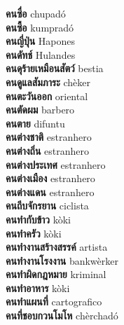 \textbf{ คนซื่อ  } chupadó \\
\textbf{ คนซื้อ  } kumpradó \\
\textbf{ คนญี่ปุ่น  } Hapones \\
\textbf{ คนดัทช์  } Hulandes \\
\textbf{ คนดุร้ายเหมือนสัตว์  } bestia \\
\textbf{ คนดูแลสัมภาระ  } chèker \\
\textbf{ คนตะวันออก  } oriental \\
\textbf{ คนตัดผม  } barbero \\
\textbf{ คนตาย  } difuntu \\
\textbf{ คนต่างชาติ  } estranhero \\
\textbf{ คนต่างถิ่น  } estranhero \\
\textbf{ คนต่างประเทศ  } estranhero \\
\textbf{ คนต่างเมือง  } estranhero \\
\textbf{ คนต่างแดน  } estranhero \\
\textbf{ คนถีบจักรยาน  } ciclista \\
\textbf{ คนทำกับข้าว  } kòki \\
\textbf{ คนทำครัว  } kòki \\
\textbf{ คนทำงานสร้างสรรค์  } artista \\
\textbf{ คนทำงานโรงงาน  } bankwèrker \\
\textbf{ คนทำผิดกฎหมาย  } kriminal \\
\textbf{ คนทำอาหาร  } kòki \\
\textbf{ คนทำแผนที่  } cartografico \\
\textbf{ คนที่ชอบกวนโมโห  } chèrchadó \\
